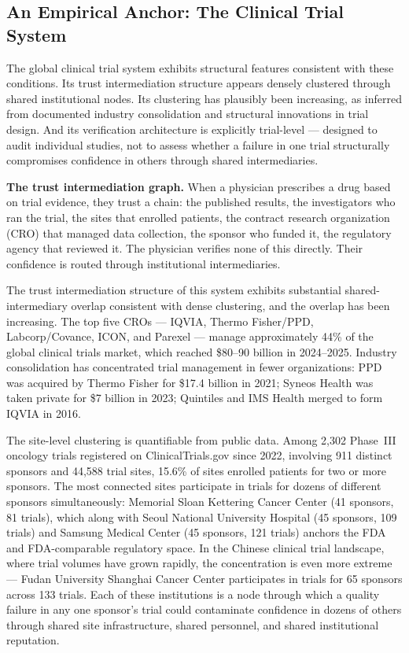 \documentclass[11pt,a4paper]{article}
\begin{document}
\subsection{An Empirical Anchor: The Clinical Trial System}

The global clinical trial system exhibits structural features consistent with these conditions. Its trust intermediation structure appears densely clustered through shared institutional nodes. Its clustering has plausibly been increasing, as inferred from documented industry consolidation and structural innovations in trial design. And its verification architecture is explicitly trial-level --- designed to audit individual studies, not to assess whether a failure in one trial structurally compromises confidence in others through shared intermediaries.

\textbf{The trust intermediation graph.} When a physician prescribes a drug based on trial evidence, they trust a chain: the published results, the investigators who ran the trial, the sites that enrolled patients, the contract research organization (CRO) that managed data collection, the sponsor who funded it, the regulatory agency that reviewed it. The physician verifies none of this directly. Their confidence is routed through institutional intermediaries.

The trust intermediation structure of this system exhibits substantial shared-intermediary overlap consistent with dense clustering, and the overlap has been increasing. The top five CROs --- IQVIA, Thermo Fisher/PPD, Labcorp/Covance, ICON, and Parexel --- manage approximately 44\% of the global clinical trials market, which reached \$80--90 billion in 2024--2025. Industry consolidation has concentrated trial management in fewer organizations: PPD was acquired by Thermo Fisher for \$17.4 billion in 2021; Syneos Health was taken private for \$7 billion in 2023; Quintiles and IMS Health merged to form IQVIA in 2016.

The site-level clustering is quantifiable from public data. Among 2,302 Phase~III oncology trials registered on ClinicalTrials.gov since 2022, involving 911 distinct sponsors and 44,588 trial sites, 15.6\% of sites enrolled patients for two or more sponsors. The most connected sites participate in trials for dozens of different sponsors simultaneously: Memorial Sloan Kettering Cancer Center (41 sponsors, 81 trials), which along with Seoul National University Hospital (45 sponsors, 109 trials) and Samsung Medical Center (45 sponsors, 121 trials) anchors the FDA and FDA-comparable regulatory space. In the Chinese clinical trial landscape, where trial volumes have grown rapidly, the concentration is even more extreme --- Fudan University Shanghai Cancer Center participates in trials for 65 sponsors across 133 trials. Each of these institutions is a node through which a quality failure in any one sponsor's trial could contaminate confidence in dozens of others through shared site infrastructure, shared personnel, and shared institutional reputation.
\end{document}
